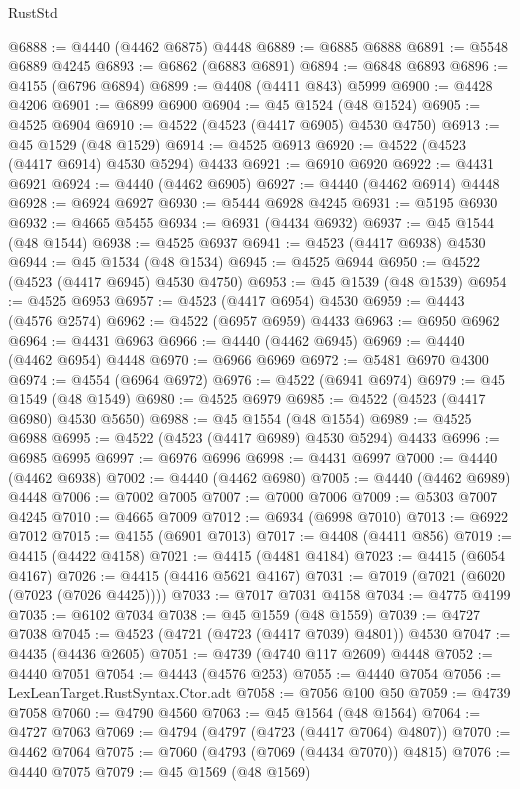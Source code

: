 \begin{lexlean}{RustStd}
\begin{coremodule}
{\begin{coremodule}
{{{{{{{{{{{{{{{{{{{{{{{{{{{{{{{{{{{{{{{{{{{{{{{{{{{{{{{{{{{{@6888 := @4440 (@4462 @6875) @4448
@6889 := @6885 @6888
@6891 := @5548 @6889 @4245
@6893 := @6862 (@6883 @6891)
@6894 := @6848 @6893
@6896 := @4155 (@6796 @6894)
@6899 := @4408 (@4411 @843) @5999
@6900 := @4428 @4206
@6901 := @6899 @6900
@6904 := @45 @1524 (@48 @1524)
@6905 := @4525 @6904
@6910 := @4522 (@4523 (@4417 @6905) @4530 @4750)
@6913 := @45 @1529 (@48 @1529)
@6914 := @4525 @6913
@6920 := @4522 (@4523 (@4417 @6914) @4530 @5294) @4433
@6921 := @6910 @6920
@6922 := @4431 @6921
@6924 := @4440 (@4462 @6905)
@6927 := @4440 (@4462 @6914) @4448
@6928 := @6924 @6927
@6930 := @5444 @6928 @4245
@6931 := @5195 @6930
@6932 := @4665 @5455
@6934 := @6931 (@4434 @6932)
@6937 := @45 @1544 (@48 @1544)
@6938 := @4525 @6937
@6941 := @4523 (@4417 @6938) @4530
@6944 := @45 @1534 (@48 @1534)
@6945 := @4525 @6944
@6950 := @4522 (@4523 (@4417 @6945) @4530 @4750)
@6953 := @45 @1539 (@48 @1539)
@6954 := @4525 @6953
@6957 := @4523 (@4417 @6954) @4530
@6959 := @4443 (@4576 @2574)
@6962 := @4522 (@6957 @6959) @4433
@6963 := @6950 @6962
@6964 := @4431 @6963
@6966 := @4440 (@4462 @6945)
@6969 := @4440 (@4462 @6954) @4448
@6970 := @6966 @6969
@6972 := @5481 @6970 @4300
@6974 := @4554 (@6964 @6972)
@6976 := @4522 (@6941 @6974)
@6979 := @45 @1549 (@48 @1549)
@6980 := @4525 @6979
@6985 := @4522 (@4523 (@4417 @6980) @4530 @5650)
@6988 := @45 @1554 (@48 @1554)
@6989 := @4525 @6988
@6995 := @4522 (@4523 (@4417 @6989) @4530 @5294) @4433
@6996 := @6985 @6995
@6997 := @6976 @6996
@6998 := @4431 @6997
@7000 := @4440 (@4462 @6938)
@7002 := @4440 (@4462 @6980)
@7005 := @4440 (@4462 @6989) @4448
@7006 := @7002 @7005
@7007 := @7000 @7006
@7009 := @5303 @7007 @4245
@7010 := @4665 @7009
@7012 := @6934 (@6998 @7010)
@7013 := @6922 @7012
@7015 := @4155 (@6901 @7013)
@7017 := @4408 (@4411 @856)
@7019 := @4415 (@4422 @4158)
@7021 := @4415 (@4481 @4184)
@7023 := @4415 (@6054 @4167)
@7026 := @4415 (@4416 @5621 @4167)
@7031 := @7019 (@7021 (@6020 (@7023 (@7026 @4425))))
@7033 := @7017 @7031 @4158
@7034 := @4775 @4199
@7035 := @6102 @7034
@7038 := @45 @1559 (@48 @1559)
@7039 := @4727 @7038
@7045 := @4523 (@4721 (@4723 (@4417 @7039) @4801)) @4530
@7047 := @4435 (@4436 @2605)
@7051 := @4739 (@4740 @117 @2609) @4448
@7052 := @4440 @7051
@7054 := @4443 (@4576 @253)
@7055 := @4440 @7054
@7056 := LexLeanTarget.RustSyntax.Ctor.adt
@7058 := @7056 @100 @50
@7059 := @4739 @7058
@7060 := @4790 @4560
@7063 := @45 @1564 (@48 @1564)
@7064 := @4727 @7063
@7069 := @4794 (@4797 (@4723 (@4417 @7064) @4807))
@7070 := @4462 @7064
@7075 := @7060 (@4793 (@7069 (@4434 @7070)) @4815)
@7076 := @4440 @7075
@7079 := @45 @1569 (@48 @1569)
}}}}}}}}}}}}}}}}}}}}}}}}}}}}}}}}}}}}}}}}}}}}}}}}}}}}}}}}}}}}
\end{coremodule}}
\end{coremodule}
\end{lexlean}
